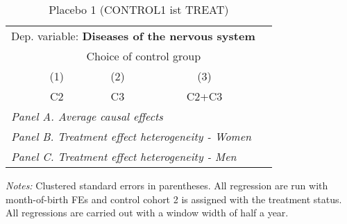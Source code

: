  \begin{table}[H] \centering \begin{threeparttable} \caption{Placebo 1 (CONTROL1 ist TREAT) } {\def\sym#1{\ifmmode^{#1}\else\(^{#1}\)\fi} \begin{tabular}{l*{4}{c}} \toprule \multicolumn{4}{l}{Dep. variable: \textbf{Diseases of the nervous system}} \\ & \multicolumn{3}{c}{Choice of control group} \\ \cmidrule(lr){2-4}
            &\multicolumn{1}{c}{(1)}&\multicolumn{1}{c}{(2)}&\multicolumn{1}{c}{(3)}\\
            &\multicolumn{1}{c}{C2}&\multicolumn{1}{c}{C3}&\multicolumn{1}{c}{C2+C3}\\
\midrule
 \multicolumn{4}{l}{\emph{Panel A. Average causal effects}} \\      \midrule\multicolumn{4}{l}{\emph{Panel B. Treatment effect heterogeneity - Women}} \\      \midrule\multicolumn{4}{l}{\emph{Panel C. Treatment effect heterogeneity - Men}} \\      
\bottomrule \end{tabular} } \begin{tablenotes} \item \scriptsize \emph{Notes:} Clustered standard errors in parentheses. All regression are run with month-of-birth FEs and control cohort 2 is assigned with the treatment status. All regressions are carried out with a window width of half a year. \end{tablenotes} \end{threeparttable} \end{table} 
